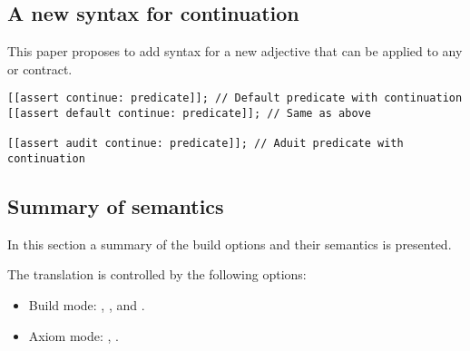 \subsection{A new syntax for continuation}

This paper proposes to add syntax for a new  adjective that can
be applied to any  or  contract.

\begin{lstlisting}
[[assert continue: predicate]]; // Default predicate with continuation
[[assert default continue: predicate]]; // Same as above

[[assert audit continue: predicate]]; // Aduit predicate with continuation
\end{lstlisting}

\subsection{Summary of semantics}

In this section a summary of the build options and their semantics is presented.

The translation is controlled by the following options:

\begin{itemize}
  \item Build mode: , , and .
  \item Axiom mode: , .
\end{itemize}

